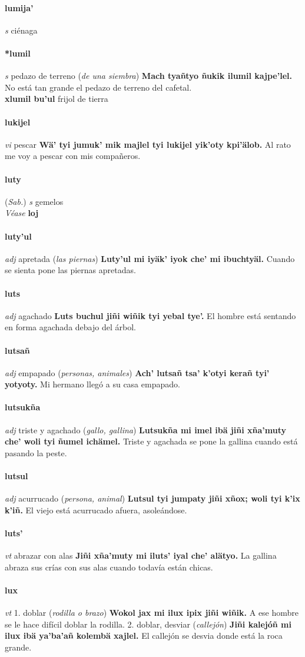 \documentclass{scrbook}
\newcommand{\entry}[1]{\paragraph{#1}}
\newcommand{\onedefinition}[1]{#1.}
\newcommand{\partofspeech}[1]{\textit{#1}}
\newcommand{\spanishtranslation}[1]{#1}
\newcommand{\clarification}[1]{(\textit{#1})}
\newcommand{\cholexample}[1]{\textbf{#1}}
\newcommand{\exampletranslation}[1]{#1}
\newcommand{\alsosee}[1]{\\\textit{Véase} \textbf{#1}}
\newcommand{\relevantdialect}[1]{(\textit{#1})}
\newcommand{\secondaryentry}[1]{\\\textbf{#1}}
\newcommand{\secondtranslation}[1]{#1}
\begin{document}
\begin{multicols}{2}
\entry{lumija'}
\partofspeech{s}
\spanishtranslation{ciénaga}

\entry{*lumil}
\partofspeech{s}
\spanishtranslation{pedazo de terreno}
\clarification{de una siembra}
\cholexample{Mach tyañtyo ñukik ilumil kajpe'lel.}
\exampletranslation{No está tan grande el pedazo de terreno del cafetal.}
\secondaryentry{xlumil bu'ul}
\secondtranslation{frijol de tierra}

\entry{lukijel}
\partofspeech{vi}
\spanishtranslation{pescar}
\cholexample{Wä' tyi jumuk' mik majlel tyi lukijel yik'oty kpi'älob.}
\exampletranslation{Al rato me voy a pescar con mis compañeros.}

\entry{luty}
\relevantdialect{Sab.}
\partofspeech{s}
\spanishtranslation{gemelos}
\alsosee{loj}

\entry{luty'ul}
\partofspeech{adj}
\spanishtranslation{apretada}
\clarification{las piernas}
\cholexample{Luty'ul mi iyäk' iyok che' mi ibuchtyäl.}
\exampletranslation{Cuando se sienta pone las piernas apretadas.}

\entry{luts}
\partofspeech{adj}
\spanishtranslation{agachado}
\cholexample{Luts buchul jiñi wiñik tyi yebal tye'.}
\exampletranslation{El hombre está sentando en forma agachada debajo del árbol.}

\entry{lutsañ}
\partofspeech{adj}
\spanishtranslation{empapado}
\clarification{personas, animales}
\cholexample{Ach' lutsañ tsa' k'otyi kerañ tyi' yotyoty.}
\exampletranslation{Mi hermano llegó a su casa empapado.}

\entry{lutsukña}
\partofspeech{adj}
\spanishtranslation{triste y agachado}
\clarification{gallo, gallina}
\cholexample{Lutsukña mi imel ibä jiñi xña'muty che' woli tyi ñumel ichämel.}
\exampletranslation{Triste y agachada se pone la gallina cuando está pasando la peste.}

\entry{lutsul}
\partofspeech{adj}
\spanishtranslation{acurrucado}
\clarification{persona, animal}
\cholexample{Lutsul tyi jumpaty jiñi xñox; woli tyi k'ix k'iñ.}
\exampletranslation{El viejo está acurrucado afuera, asoleándose.}

\entry{luts'}
\partofspeech{vt}
\spanishtranslation{abrazar con alas}
\cholexample{Jiñi xña'muty mi iluts' iyal che' alätyo.}
\exampletranslation{La gallina abraza sus crías con sus alas cuando todavía están chicas.}

\entry{lux}
\partofspeech{vt}
\onedefinition{1}
\spanishtranslation{doblar}
\clarification{rodilla o brazo}
\cholexample{Wokol jax mi ilux ipix jiñi wiñik.}
\exampletranslation{A ese hombre se le hace difícil doblar la rodilla.}
\onedefinition{2}
\spanishtranslation{doblar, desviar}
\clarification{callejón}
\cholexample{Jiñi kalejóñ mi ilux ibä ya'ba'añ kolembä xajlel.}
\exampletranslation{El callejón se desvia donde está la roca grande.}


\end{multicols}
\end{document}
